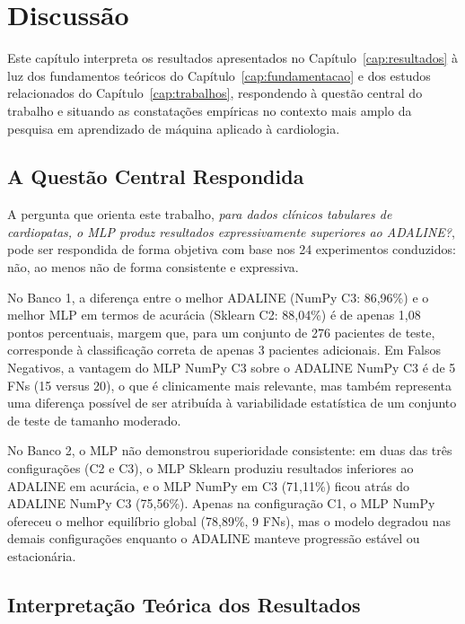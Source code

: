 \chapter{Discuss\~ao}
\label{cap:discussao}

Este cap\'itulo interpreta os resultados apresentados no Cap\'itulo~\ref{cap:resultados} \`a luz dos fundamentos te\'oricos do Cap\'itulo~\ref{cap:fundamentacao} e dos estudos relacionados do Cap\'itulo~\ref{cap:trabalhos}, respondendo \`a quest\~ao central do trabalho e situando as constata\c c\~oes emp\'iricas no contexto mais amplo da pesquisa em aprendizado de m\'aquina aplicado \`a cardiologia.

\section{A Quest\~ao Central Respondida}
\label{sec:questao_central}

A pergunta que orienta este trabalho, \textit{para dados cl\'inicos tabulares de cardiopatas, o MLP produz resultados expressivamente superiores ao ADALINE?}, pode ser respondida de forma objetiva com base nos 24 experimentos conduzidos: n\~ao, ao menos n\~ao de forma consistente e expressiva.

No Banco 1, a diferen\c ca entre o melhor ADALINE (NumPy C3: 86,96\%) e o melhor MLP em termos de acur\'acia (Sklearn C2: 88,04\%) \'e de apenas 1,08 pontos percentuais, margem que, para um conjunto de 276 pacientes de teste, corresponde \`a classifica\c c\~ao correta de apenas 3 pacientes adicionais. Em Falsos Negativos, a vantagem do MLP NumPy C3 sobre o ADALINE NumPy C3 \'e de 5 FNs (15 versus 20), o que \'e clinicamente mais relevante, mas tamb\'em representa uma diferen\c ca poss\'ivel de ser atribu\'ida \`a variabilidade estat\'istica de um conjunto de teste de tamanho moderado.

No Banco 2, o MLP n\~ao demonstrou superioridade consistente: em duas das tr\^es configura\c c\~oes (C2 e C3), o MLP Sklearn produziu resultados inferiores ao ADALINE em acur\'acia, e o MLP NumPy em C3 (71,11\%) ficou atr\'as do ADALINE NumPy C3 (75,56\%). Apenas na configura\c c\~ao C1, o MLP NumPy ofereceu o melhor equil\'ibrio global (78,89\%, 9 FNs), mas o modelo degradou nas demais configura\c c\~oes enquanto o ADALINE manteve progress\~ao estável ou estacion\'aria.

\section{Interpreta\c c\~ao Te\'orica dos Resultados}
\label{sec:interpretacao_teorica}


